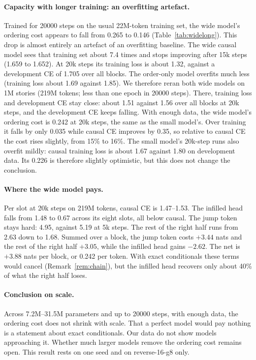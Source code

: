 \documentclass[11pt]{article}
\theoremstyle{definition}
\theoremstyle{remark}
\newcommand{\sch}[1]{\textsf{#1}}
\begin{document}
\paragraph{Capacity with longer training: an overfitting artefact.}
Trained for 20000 steps on the usual 22M-token training set, the wide model's ordering cost appears to fall from 0.265 to 0.146 (Table~\ref{tab:widelong}).
This drop is almost entirely an artefact of an overfitting baseline.
The wide causal model sees that training set about 7.4 times and stops improving after 15k steps (1.659 to 1.652).
At 20k steps its training loss is about 1.32, against a development CE of 1.705 over all blocks.
The order-only model overfits much less (training loss about 1.69 against 1.85).
We therefore reran both wide models on 1M stories (219M tokens; less than one epoch in 20000 steps).
There, training loss and development CE stay close: about 1.51 against 1.56 over all blocks at 20k steps, and the development CE keeps falling.
With enough data, the wide model's ordering cost is 0.242 at 20k steps, the same as the small model's.
Over training it falls by only 0.035 while causal CE improves by 0.35, so relative to causal CE the cost rises slightly, from 15\% to 16\%.
The small model's 20k-step runs also overfit mildly: causal training loss is about 1.67 against 1.80 on development data.
Its 0.226 is therefore slightly optimistic, but this does not change the conclusion.

\paragraph{Where the wide model pays.}
Per slot at 20k steps on 219M tokens, causal CE is 1.47--1.53.
The infilled head falls from 1.48 to 0.67 across its eight slots, all below causal.
The jump token stays hard: 4.95, against 5.19 at 5k steps.
The rest of the right half runs from 2.63 down to 1.68.
Summed over a block, the jump token costs $+3.44$ nats and the rest of the right half $+3.05$, while the infilled head gains $-2.62$.
The net is $+3.88$ nats per block, or 0.242 per token.
With exact conditionals these terms would cancel (Remark~\ref{rem:chain}), but the infilled head recovers only about 40\% of what the right half loses.

\paragraph{Conclusion on scale.}
Across 7.2M--31.5M parameters and up to 20000 steps, with enough data, the ordering cost does not shrink with scale.
That a perfect model would pay nothing is a statement about exact conditionals.
Our data do not show models approaching it.
Whether much larger models remove the ordering cost remains open.
This result rests on one seed and on \sch{reverse-16-g8} only.
\end{document}
